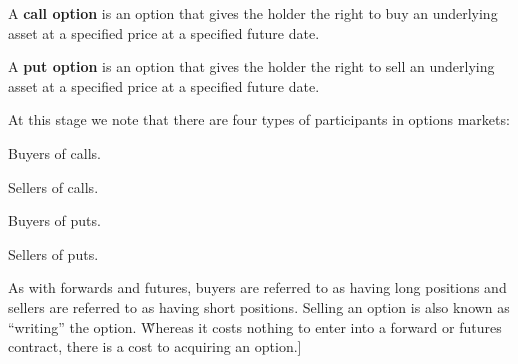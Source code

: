 A \textbf{call option} is an option that gives the holder the right to buy an underlying asset at a specified price
at a specified future date.
\ed

A \textbf{put option} is an option that gives the holder the right to sell an underlying asset at a specified price
at a specified future date.
\ed

At this stage we note that there are four types of participants in options markets:
\bit
\item Buyers of calls.
\item Sellers of calls.
\item Buyers of puts.
\item Sellers of puts.
\eit

As with forwards and futures, buyers are referred to as having long positions and sellers are referred to as having
short positions. Selling an option is also known as ``writing'' the option. \v

Whereas it costs nothing to enter into a forward or futures contract, there is a cost to acquiring an option.]